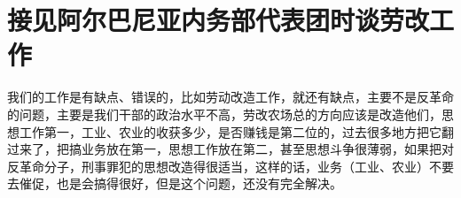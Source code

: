 \section[接见阿尔巴尼亚内务部代表团时谈劳改工作（一九六五年九月十八日）]{接见阿尔巴尼亚内务部代表团时谈劳改工作}


我们的工作是有缺点、错误的，比如劳动改造工作，就还有缺点，主要不是反革命的问题，主要是我们干部的政治水平不高，劳改农场总的方向应该是改造他们，思想工作第一，工业、农业的收获多少，是否赚钱是第二位的，过去很多地方把它翻过来了，把搞业务放在第一，思想工作放在第二，甚至思想斗争很薄弱，如果把对反革命分子，刑事罪犯的思想改造得很适当，这样的话，业务（工业、农业）不要去催促，也是会搞得很好，但是这个问题，还没有完全解决。

